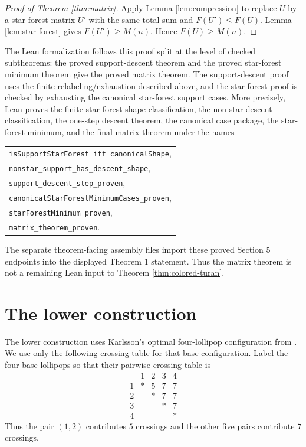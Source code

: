 \documentclass[12pt]{article}
\theoremstyle{plain}
\theoremstyle{definition}
\theoremstyle{remark}
\begin{document}
\begin{proof}[Proof of Theorem \ref{thm:matrix}]
Apply Lemma \ref{lem:compression} to replace \(U\) by a star-forest matrix
\(U'\) with the same total sum and \(F(U')\le F(U)\).  Lemma
\ref{lem:star-forest} gives \(F(U')\ge M(n)\).  Hence \(F(U)\ge M(n)\).
\end{proof}

The Lean formalization follows this proof split at the level of checked
subtheorems: the proved support-descent theorem and the proved star-forest
minimum theorem give the proved matrix theorem.  The support-descent proof uses
the finite relabeling/exhaustion described above, and the star-forest proof is
checked by exhausting the canonical star-forest support cases.  More
precisely, Lean proves the finite star-forest shape classification, the
non-star descent classification, the one-step descent theorem, the canonical
case package, the star-forest minimum, and the final matrix theorem under the
names
\begin{center}
\begin{tabular}{@{}l@{}}
\texttt{isSupportStarForest\_iff\_canonicalShape},\\
\texttt{nonstar\_support\_has\_descent\_shape},\\
\texttt{support\_descent\_step\_proven},\\
\texttt{canonicalStarForestMinimumCases\_proven},\\
\texttt{starForestMinimum\_proven},\\
\texttt{matrix\_theorem\_proven}.
\end{tabular}
\end{center}
The separate theorem-facing assembly files import these proved Section 5
endpoints into the displayed Theorem 1 statement.  Thus the matrix theorem is
not a remaining Lean input to Theorem \ref{thm:colored-turan}.

\section{The lower construction}\label{sec:lower}

The lower construction uses Karlsson's optimal four-lollipop configuration
from \cite{CKS}.  We use only the following crossing table for that base
configuration.  Label the four base lollipops so that their pairwise crossing
table is
\[
\begin{array}{c|cccc}
 &1&2&3&4\\
\hline
1&*&5&7&7\\
2&&*&7&7\\
3&&&*&7\\
4&&&&*
\end{array}
\]
Thus the pair \((1,2)\) contributes \(5\) crossings and the other five pairs
contribute \(7\) crossings.
\end{document}
